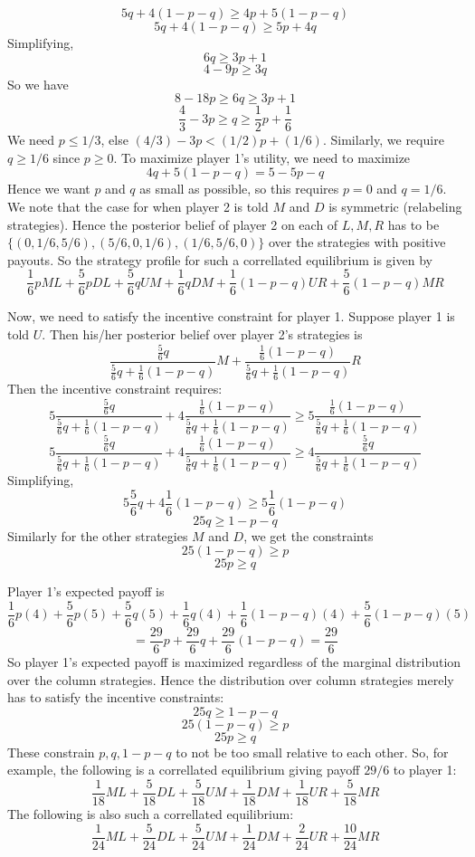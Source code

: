 \documentclass[10pt,letter]{article}
\begin{document}
\begin{enumerate}[label=(\alph*)]
\[ 5q + 4(1-p-q) \ge 4p + 5(1-p-q) \]
\[ 5q + 4(1-p-q) \ge 5p + 4q \]
Simplifying,
\[ 6q \ge 3p + 1 \]
\[ 4 - 9p \ge 3q  \]
So we have
\[ 8 - 18p \ge 6q \ge 3p + 1  \]
\[ \frac{4}{3} - 3p \ge q \ge \frac{1}{2}p + \frac{1}{6}  \]
We need $p \le 1/3$, else $(4/3) - 3p < (1/2)p + (1/6)$. Similarly, we require $q \ge 1/6$ since $p \ge 0$. To maximize player 1's utility, we need to maximize
\[ 4q + 5(1-p-q) = 5 - 5p - q \]
Hence we want $p$ and $q$ as small as possible, so this requires $p = 0$ and $q = 1/6$. We note that the case for when player 2 is told $M$ and $D$ is symmetric (relabeling strategies). Hence the posterior belief of player 2 on each of $L, M, R$ has to be $\{ (0, 1/6, 5/6), (5/6, 0, 1/6), (1/6, 5/6, 0) \} $ over the strategies with positive payouts. So the strategy profile for such a correllated equilibrium is given by
\[ \frac{1}{6}p ML + \frac{5}{6}p DL  + \frac{5}{6}q UM +  \frac{1}{6}q DM  + \frac{1}{6}(1-p-q) UR + \frac{5}{6}(1-p-q) MR  \]

Now, we need to satisfy the incentive constraint for player 1. Suppose player 1 is told $U$. Then his/her posterior belief over player 2's strategies is \[  \frac{\frac{5}{6}q }{\frac{5}{6}q + \frac{1}{6}(1-p-q)}M + \frac{\frac{1}{6}(1-p-q) }{\frac{5}{6}q + \frac{1}{6}(1-p-q)}R \] Then the incentive constraint requires:
\[ 5\frac{\frac{5}{6}q }{\frac{5}{6}q + \frac{1}{6}(1-p-q)} + 4\frac{\frac{1}{6}(1-p-q) }{\frac{5}{6}q + \frac{1}{6}(1-p-q)} \ge 5\frac{\frac{1}{6}(1-p-q) }{\frac{5}{6}q + \frac{1}{6}(1-p-q)} \]
\[ 5\frac{\frac{5}{6}q }{\frac{5}{6}q + \frac{1}{6}(1-p-q)} + 4\frac{\frac{1}{6}(1-p-q) }{\frac{5}{6}q + \frac{1}{6}(1-p-q)} \ge 4\frac{\frac{5}{6}q }{\frac{5}{6}q + \frac{1}{6}(1-p-q)}\]
Simplifying,
\[ 5\frac{5}{6}q  + 4\frac{1}{6}(1-p-q) \ge 5\frac{1}{6}(1-p-q)  \]
\[ 25q  \ge 1-p-q  \]
Similarly for the other strategies $M$ and $D$, we get the constraints
\[ 25(1-p-q) \ge p \]
\[ 25p \ge q \]

Player 1's expected payoff is
\[ \frac{1}{6}p (4) + \frac{5}{6}p (5)  + \frac{5}{6}q (5) +  \frac{1}{6}q (4)  + \frac{1}{6}(1-p-q) (4)+ \frac{5}{6}(1-p-q) (5)  \]
\[ = \frac{29}{6}p    + \frac{29}{6}q + \frac{29}{6}(1-p-q) =  \frac{29}{6} \]
So player 1's expected payoff is maximized regardless of the marginal distribution over the column strategies. Hence the distribution over column strategies merely has to satisfy the incentive constraints:
\[ 25q  \ge 1-p-q  \]
\[ 25(1-p-q) \ge p \]
\[ 25p \ge q \]
These constrain $p, q, 1-p-q$ to not be too small relative to each other.
So, for example, the following is a correllated equilibrium giving payoff $29/6$ to player 1:
\[ \frac{1}{18} ML + \frac{5}{18} DL  + \frac{5}{18} UM +  \frac{1}{18} DM  + \frac{1}{18} UR + \frac{5}{18} MR  \]
The following is also such a correllated equilibrium:
\[ \frac{1}{24} ML + \frac{5}{24} DL  + \frac{5}{24} UM +  \frac{1}{24} DM  + \frac{2}{24} UR + \frac{10}{24} MR  \]
\end{enumerate}
\end{document}
